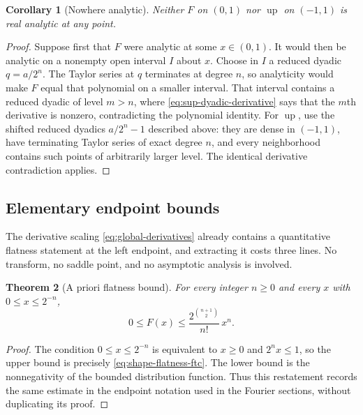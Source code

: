 \documentclass[11pt,oneside]{article}
\newtheorem{theorem}{Theorem}[section]
\newtheorem{corollary}[theorem]{Corollary}
\theoremstyle{definition}
\theoremstyle{remark}
\newcommand{\Up}{\operatorname{up}}
\begin{document}
\begin{corollary}[Nowhere analytic]
Neither $F$ on $(0,1)$ nor $\Up$ on $(-1,1)$ is real analytic at any point.
\end{corollary}

\begin{proof}
Suppose first that $F$ were analytic at some $x\in(0,1)$.  It would then be analytic on a
nonempty open interval $I$ about $x$.  Choose in $I$ a reduced dyadic $q=a/2^n$.  The Taylor
series at $q$ terminates at degree $n$, so analyticity would make $F$ equal that polynomial
on a smaller interval.  That interval contains a reduced dyadic of level $m>n$, where
\eqref{eq:sup-dyadic-derivative} says that the $m$th derivative is nonzero, contradicting the
polynomial identity.  For $\Up$, use the shifted reduced dyadics
$a/2^n-1$ described above: they are dense in $(-1,1)$, have terminating Taylor series of
exact degree $n$, and every neighborhood contains such points of arbitrarily larger level.
The identical derivative contradiction applies.
\end{proof}


\subsection{Elementary endpoint bounds}

The derivative scaling \eqref{eq:global-derivatives} already contains a quantitative flatness
statement at the left endpoint, and extracting it costs three lines.  No transform, no
saddle point, and no asymptotic analysis is involved.

\begin{theorem}[A priori flatness bound]
\label{thm:four-flat-bound}
For every integer $n\ge0$ and every $x$ with $0\le x\le2^{-n}$,
\begin{equation}
 0\le F(x)\le\frac{2^{\binom{n+1}{2}}}{n!}\,x^n.          \label{eq:four-flat-bound}
\end{equation}
\end{theorem}

\begin{proof}
The condition $0\le x\le2^{-n}$ is equivalent to $x\ge0$ and $2^nx\le1$, so the upper
bound is precisely \eqref{eq:shape-flatness-ftc}.  The lower bound is the nonnegativity of
the bounded distribution function.  Thus this restatement records the same estimate in the
endpoint notation used in the Fourier sections, without duplicating its proof.
\end{proof}
\end{document}
